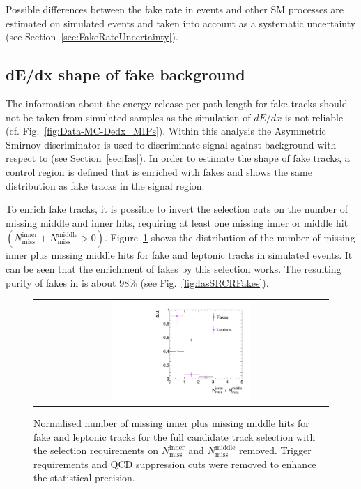 Possible differences between the fake rate in \Zlep events and other SM processes are estimated on simulated events and taken into account as a systematic uncertainty (see Section~\ref{sec:FakeRateUncertainty}).

\subsection*{dE/dx shape of fake background}
The information about the energy release per path length for fake tracks should not be taken from simulated samples as the simulation of $dE/dx$ is not reliable (cf. Fig.~\ref{fig:Data-MC-Dedx_MIPs}).
Within this analysis the Asymmetric Smirnov discriminator \ias is used to discriminate signal against background with respect to \dedx (see Section~\ref{sec:Ias}). 
In order to estimate the \ias shape of fake tracks, a control region \fakeCR is defined that is enriched with fakes and shows the same \ias distribution as fake tracks in the signal region.

To enrich fake tracks, it is possible to invert the selection cuts on the number of missing middle and inner hits, \ie requiring at least one missing inner or middle hit $\left( N_{\text{miss}}^{\text{inner}} +N_{\text{miss}}^{\text{middle}}>0\right)$.
Figure~\ref{fig:NMissInnerAndMiddle} shows the distribution of the number of missing inner plus missing middle hits for fake and leptonic tracks in simulated \WJets events.
It can be seen that the enrichment of fakes by this selection works.
The resulting purity of fakes in \fakeCR is about 98\% (see Fig.~\ref{fig:IasSRCRFakes}). 
\begin{figure}[!b]
  \centering 
  \begin{tabular}{c}
    \includegraphics[width=0.49\textwidth]{figures/analysis/Background/NLostInnerPlusMiddleForAllBkg_chiTracksQCDsupressionTrigger.pdf}
  \end{tabular}
  \caption{Normalised number of missing inner plus missing middle hits for fake and leptonic tracks for the full candidate track selection with the selection requirements on $N_{\text{miss}}^{\text{inner}}$ and $N_{\text{miss}}^{\text{middle}}$ removed. Trigger requirements and QCD suppression cuts were removed to enhance the statistical precision.}
  \label{fig:NMissInnerAndMiddle}
\end{figure}

